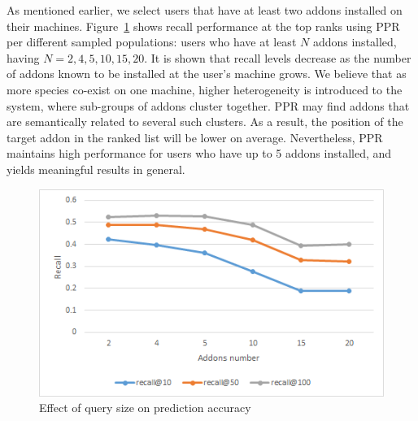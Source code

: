 \documentclass[ijoc,nonblindrev]{informs3} %
\numberwithin{equation}{subsection}
\begin{document}
As mentioned earlier, we select users that have at least two addons installed on their machines. Figure~\ref{fig:addonsNumberGraph} shows recall performance at the top ranks using PPR per different sampled populations: users who have at least $N$ addons installed, having $N=2,4,5,10,15,20$. It is shown that recall levels decrease as the number of addons known to be installed at the user's machine grows. We believe that as more species co-exist on one machine, higher heterogeneity is introduced to the system, where sub-groups of addons cluster together. PPR may find addons that are semantically related to several such clusters. As a result, the position of the target addon in the ranked list will be lower on average. Nevertheless, PPR maintains high performance for users who have up to 5 addons installed, and yields meaningful results in general. 

\begin{figure}[!htbp]
\centering
\includegraphics[scale=1,angle=0]{figures/addonsNumberGraph.png}
\caption{Effect of query size on prediction accuracy}
\label{fig:addonsNumberGraph}
\end{figure}
\fi

\end{document}
